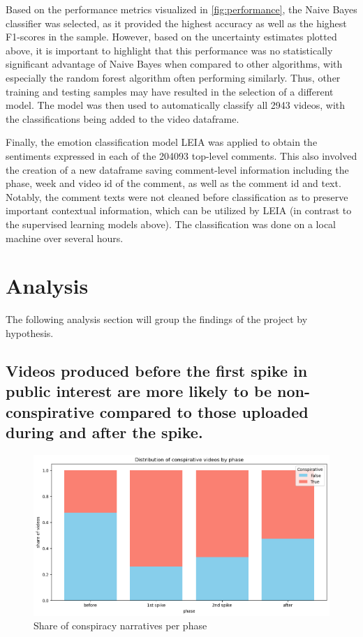 \documentclass[fontsize=11pt, parskip=half]{scrartcl}
\begin{document}
    Based on the performance metrics visualized in \ref{fig:performance}, the Naive Bayes classifier was selected, as it provided the highest accuracy as well as the highest F1-scores in the sample. However, based on the uncertainty estimates plotted above, it is important to highlight that this performance was no statistically significant advantage of Naive Bayes when compared to other algorithms, with especially the random forest algorithm often performing similarly. Thus, other training and testing samples may have resulted in the selection of a different model. The model was then used to automatically classify all 2943 videos, with the classifications being added to the video dataframe. 

    Finally, the emotion classification model LEIA was applied to obtain the sentiments expressed in each of the 204093 top-level comments. This also involved the creation of a new dataframe saving comment-level information including the phase, week and video id of the comment, as well as the comment id and text. Notably, the comment texts were not cleaned before classification as to preserve important contextual information, which can be utilized by LEIA (in contrast to the supervised learning models above). The classification was done on a local machine over several hours.
    
\section{Analysis}
\label{section:analysis}

    The following analysis section will group the findings of the project by hypothesis.

    \subsection{Videos produced before the first spike in public interest are more likely to be non-conspirative compared to those uploaded during and after the spike.}

    \begin{figure}
        \centering
        \vspace{-20pt}
        \setlength\intextsep{0pt}
        \includegraphics[width=0.58 \textwidth]{img/conspirative_phase.png}
        \vspace{-5pt}
        \caption{Share of conspiracy narratives per phase}
        \vspace{-10pt}
        \label{fig:conspiracy_phase}
    \end{figure}
\end{document}
